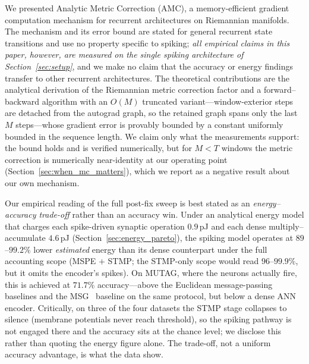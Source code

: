 \documentclass[a4paper,fleqn]{cas-dc}
\begin{document}
We presented Analytic Metric Correction (AMC), a memory-efficient gradient computation mechanism for recurrent architectures on Riemannian manifolds. The mechanism and its error bound are stated for general recurrent state transitions and use no property specific to spiking; \emph{all empirical claims in this paper, however, are measured on the single spiking architecture of Section~\ref{sec:setup}}, and we make no claim that the accuracy or energy findings transfer to other recurrent architectures. The theoretical contributions are the analytical derivation of the Riemannian metric correction factor and a forward--backward algorithm with an $O(M)$ truncated variant---window-exterior steps are detached from the autograd graph, so the retained graph spans only the last $M$ steps---whose gradient error is provably bounded by a constant uniformly bounded in the sequence length. We claim only what the measurements support: the bound holds and is verified numerically, but for $M<T$ windows the metric correction is numerically near-identity at our operating point (Section~\ref{sec:when_mc_matters}), which we report as a negative result about our own mechanism.

Our empirical reading of the full post-fix sweep is best stated as an \emph{energy--accuracy trade-off} rather than an accuracy win. Under an analytical energy model that charges each spike-driven synaptic operation $0.9$\,pJ and each dense multiply--accumulate $4.6$\,pJ (Section~\ref{sec:energy_pareto}), the spiking model operates at $89$--$99.2\%$ lower \emph{estimated} energy than its dense counterpart under the full accounting scope (MSPE $+$ STMP; the STMP-only scope would read $96$--$99.9\%$, but it omits the encoder's spikes). On MUTAG, where the neurons actually fire, this is achieved at $71.7\%$ accuracy---above the Euclidean message-passing baselines and the MSG~\citep{Sun24MSG} baseline on the same protocol, but below a dense ANN encoder. Critically, on three of the four datasets the STMP stage collapses to silence (membrane potentials never reach threshold), so the spiking pathway is not engaged there and the accuracy sits at the chance level; we disclose this rather than quoting the energy figure alone. The trade-off, not a uniform accuracy advantage, is what the data show.
\end{document}
